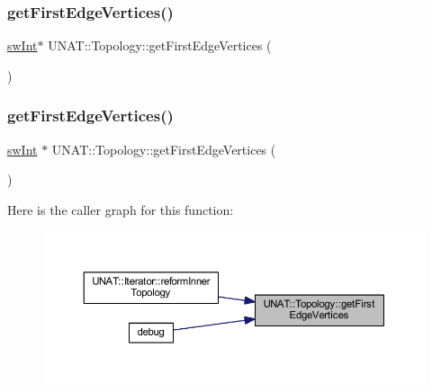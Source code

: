\mbox{\label{classUNAT_1_1Topology_a3df6e0098b30c960b01989b7e8044431}} 
\subsubsection{\texorpdfstring{getFirstEdgeVertices()}{getFirstEdgeVertices()}\hspace{0.1cm}{\footnotesize\ttfamily [2/3]}}
{\footnotesize\ttfamily \mbox{\hyperlink{include_2swMacro_8h_a113cf5f6b5377cdf3fac6aa4e443e9aa}{sw\+Int}}$\ast$ U\+N\+A\+T\+::\+Topology\+::get\+First\+Edge\+Vertices (\begin{DoxyParamCaption}{ }\end{DoxyParamCaption})}

\mbox{\label{classUNAT_1_1Topology_a5ad1f147650d0c68c181230f88e3af18}} 
\subsubsection{\texorpdfstring{getFirstEdgeVertices()}{getFirstEdgeVertices()}\hspace{0.1cm}{\footnotesize\ttfamily [3/3]}}
{\footnotesize\ttfamily \mbox{\hyperlink{include_2swMacro_8h_a113cf5f6b5377cdf3fac6aa4e443e9aa}{sw\+Int}} $\ast$ U\+N\+A\+T\+::\+Topology\+::get\+First\+Edge\+Vertices (\begin{DoxyParamCaption}{ }\end{DoxyParamCaption})}

Here is the caller graph for this function\+:
\nopagebreak
\begin{figure}[H]
\begin{center}
\leavevmode
\includegraphics[width=350pt]{classUNAT_1_1Topology_a5ad1f147650d0c68c181230f88e3af18_icgraph}
\end{center}
\end{figure}
\mbox{\label{classUNAT_1_1Topology_aef52b7de5eb5124aaa4fa05ddbd6e736}} 
